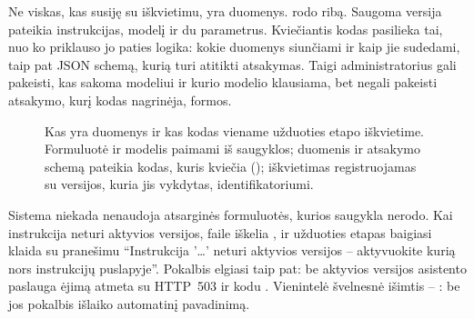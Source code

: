 Ne viskas, kas susiję su iškvietimu, yra duomenys.  rodo ribą.
Saugoma versija pateikia instrukcijas, modelį ir du parametrus. Kviečiantis kodas pasilieka tai,
nuo ko priklauso jo paties logika: kokie duomenys siunčiami ir kaip jie sudedami, taip pat JSON
schemą, kurią turi atitikti atsakymas. Taigi administratorius gali pakeisti, kas sakoma modeliui
ir kurio modelio klausiama, bet negali pakeisti atsakymo, kurį kodas nagrinėja, formos.

\begin{figure}[H]
\centering
{}
\actorlegend
\caption{Kas yra duomenys ir kas kodas viename užduoties etapo iškvietime. Formuluotė ir modelis
paimami iš saugyklos; duomenis ir atsakymo schemą pateikia kodas, kuris kviečia
 (); iškvietimas registruojamas su versijos, kuria jis
vykdytas, identifikatoriumi.}\label{fig:prompts:split}
\end{figure}

Sistema niekada nenaudoja atsarginės formuluotės, kurios saugykla nerodo. Kai instrukcija neturi
aktyvios versijos,  faile  iškelia
, ir užduoties etapas baigiasi klaida su pranešimu \enquote{Instrukcija
'…' neturi aktyvios versijos -- aktyvuokite kurią nors instrukcijų puslapyje}. Pokalbis elgiasi taip
pat: be aktyvios  versijos asistento paslauga ėjimą atmeta su HTTP~503 ir
kodu . Vienintelė švelnesnė išimtis -- : be jos
pokalbis išlaiko automatinį pavadinimą.


